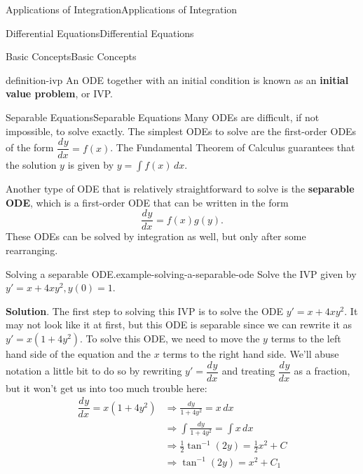 \documentclass[10pt,]{book}
\newcommand{\terminology}[1]{\textbf{#1}}
\numberwithin{equation}{section}
\newcommand{\dv}[3][]{\dfrac{d^{#1} #2}{d #3^{#1}}}
\begin{document}
\begin{chapterptx}{Applications of Integration}{}{Applications of Integration}{}{}
\begin{sectionptx}{Differential Equations}{}{Differential Equations}{}{}
\begin{subsectionptx}{Basic Concepts}{}{Basic Concepts}{}{}
\begin{definition}{}{definition-ivp}%
\hypertarget{p-728}{}%
An ODE together with an initial condition is known as an \terminology{initial value problem}, or IVP.%
\end{definition}
\end{subsectionptx}
%
%
\typeout{************************************************}
\typeout{************************************************}
%
\begin{subsectionptx}{Separable Equations}{}{Separable Equations}{}{}\label{subsection-separable-equations}
\hypertarget{p-729}{}%
Many ODEs are difficult, if not impossible, to solve exactly. The simplest ODEs to solve are the first-order ODEs of the form \(\dv{y}{x} = f(x)\). The Fundamental Theorem of Calculus guarantees that the solution \(y\) is given by \(y = \int f(x)\,dx\).%
\par
\hypertarget{p-730}{}%
Another type of ODE that is relatively straightforward to solve is the \terminology{separable ODE}, which is a first-order ODE that can be written in the form%
%
\begin{equation*}
\dv{y}{x} = f(x)g(y).
\end{equation*}
\hypertarget{p-731}{}%
These ODEs can be solved by integration as well, but only after some rearranging.%
\begin{example}{Solving a separable ODE.}{example-solving-a-separable-ode}%
\hypertarget{p-732}{}%
Solve the IVP given by \(y' = x+4xy^{2}, y(0)=1\).%
\par\smallskip%
\noindent\textbf{Solution}.\hypertarget{solution-154}{}\quad%
\hypertarget{p-733}{}%
The first step to solving this IVP is to solve the ODE \(y' = x+4xy^{2}\). It may not look like it at first, but this ODE is separable since we can rewrite it as \(y' = x(1+4y^{2})\). To solve this ODE, we need to move the \(y\) terms to the left hand side of the equation and the \(x\) terms to the right hand side. We'll abuse notation a little bit to do so by rewriting \(y' = \dv{y}{x}\) and treating \(\dv{y}{x}\) as a fraction, but it won't get us into too much trouble here:%
%
\begin{align*}
\dv{y}{x} = x(1+4y^{2}) &\Rightarrow \frac{dy}{1+4y^{2}} = x\,dx \\
&\Rightarrow \int\frac{dy}{1+4y^{2}}  = \int x\,dx \\
&\Rightarrow \frac{1}{2}\tan^{-1}(2y)  = \frac{1}{2}x^{2}+C \\
&\Rightarrow \tan^{-1}(2y)  = x^{2}+C_{1} 

\end{align*}
\end{example}
\end{subsectionptx}
\end{sectionptx}
\end{chapterptx}
\end{document}
